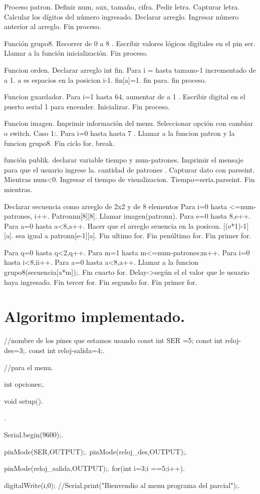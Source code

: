 \documentclass{article}
\begin{document}
Proceso patron.
Definir num, aux, tamaño, cifra.
Pedir letra.
Capturar letra.
Calcular los dígitos del número ingresado.
Declarar arreglo.
Ingresar número anterior al arreglo.
Fin proceso.

Función grupo8.
Recorrer de 0 a 8 .
Escribir valores lógicos digitales en el pin ser.
Llamar a la función inicialización.
Fin proceso.




Funcion orden.
Declarar arreglo int fin.
Para i = hasta tamano-1 incrementado de a 1.
a es espacios en la posicion i-1.
fin[a]=1.
fin para.
fin proceso.

Funcion guardador.
Para i=1 hasta 64, aumentar de a 1 .
Escribir digital en el puerto serial 1 para encender. 
Inicializar.
Fin proceso.

Funcion imagen.
Imprimir información del menu.
Seleccionar opción con cambiar o switch. 
Caso 1:.
Para i=0 hasta hasta 7 .
Llamar a la funcion patron y la funcion grupo8.
Fin ciclo for.
break.
 
función publik.
declarar variable tiempo y num-patrones.
Imprimir el mensaje para que el usuario ingrese la. cantidad de patrones .
Capturar dato con  parseint.
Mientras num<0.
Ingresar el tiempo de visualizacion. 
Tiempo=seria.parseint.
Fin mientras.

Declarar secuencia como arreglo de 2x2 y de 8 elementos 
Para i=0 hasta <=num-patrones, i++.
Patronnn[8][8].
Llamar imagen(patronn).
Para e=0 hasta 8,e++.
Para a=0 hasta a<8,a++.
Hacer que el arreglo seuencia en la posicon. [(e*1)-1][a].
sea igual a patronn[e-1][a].
Fin ultimo for.
Fin penúltimo for.
Fin primer for.
 
Para q=0 hasta q<2,q++.
Para m=1 hasta m<=num-patrones;m++.
Para i=0 hasta i<8,ii++.
Para a=0 hasta a<8,a++.
Llamar a la funcion grupo8(secuencia[a*m]);.
Fin cuarto for.
Delay->según el el valor que le usuario haya ingresado.
Fin tercer for.
Fin segundo for.
Fin primer for.
\section{Algoritmo implementado.}
//nombre de los pines que estamos usando 
const int SER =5;
const int reloj-des=3;.
const int reloj-salida=4;.

//para el menu.

int opciones;.


void setup().
{.
  
  Serial.begin(9600);. 
  
  pinMode(SER,OUTPUT);.
  pinMode(reloj_des,OUTPUT);.
  
  
  pinMode(reloj_salida,OUTPUT);.
  for(int i=3;i ==5;i++).
  
  {digitalWrite(i,0); }
  //Serial.print("Bienvendio al menu programa del parcial");.
  
}
\end{document}
